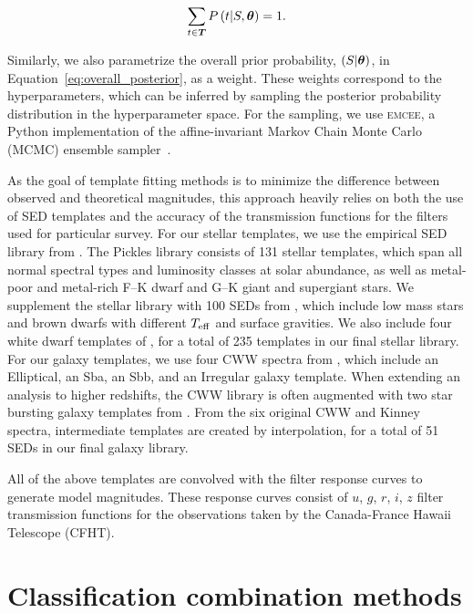 \documentclass[useAMS,usenatbib]{mn2e}
\begin{document}
\begin{equation}
\sum_{t \in \bmath{T}}
P \left(t | S, \bmath{\theta} \right) = 1.
\end{equation}

\noindent
Similarly, we also parametrize the overall prior probability,
$\left(S | \bmath{\theta}\right)$, in Equation~\ref{eq:overall_posterior},
as a weight.
These weights correspond to the hyperparameters,
which can be inferred by sampling
the posterior probability distribution in the hyperparameter space.
For the sampling, we use \textsc{emcee}, a Python implementation of the
affine-invariant Markov Chain Monte Carlo (MCMC) ensemble sampler~\citep{Foreman-Mackey2013}.  

As the goal of template fitting methods is to minimize
the difference between observed and theoretical magnitudes,
this approach heavily relies on
both the use of SED templates and
the accuracy of the transmission functions
for the filters used for particular survey.
For our stellar templates,
we use the empirical SED library from \citet{pickles1998stellar}.
The Pickles library consists of 131 stellar templates,
which span all normal spectral types
and luminosity classes at solar abundance,
as well as metal-poor and metal-rich F--K dwarf 
and G--K giant and supergiant stars.
We supplement the stellar library with
100 SEDs from \citet{chabrier2000evolutionary},
which include low mass stars and brown dwarfs
with different $T_{{\mathrm{eff}}}$ and surface gravities.
We also include four white dwarf templates of
\citet*{bohlin1995white}, for a total of 235 templates
in our final stellar library.  
For our galaxy templates,
we use four CWW spectra from \cite*{coleman1980colors},
which include an Elliptical, an Sba, an Sbb,
and an Irregular galaxy template.
When extending an analysis to higher redshifts,
the CWW library is often augmented with
two star bursting galaxy templates from \cite{kinney1996template}.
From the six original CWW and Kinney spectra,
intermediate templates are created by interpolation,
for a total of 51 SEDs in our final galaxy library.

All of the above templates are convolved
with the filter response curves to generate model magnitudes.
These response curves consist of
$u$, $g$, $r$, $i$, $z$ filter transmission functions
for the observations taken by the
Canada-France Hawaii Telescope (CFHT).


\section{Classification combination methods}
  \label{section:classification_combination_methods}
\end{document}
